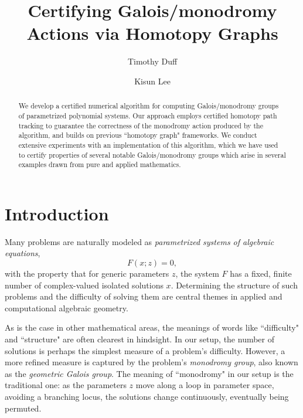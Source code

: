 \documentclass[11pt]{amsart}
\title{Certifying Galois/monodromy Actions via Homotopy Graphs}
\author{Timothy Duff}
\author{Kisun Lee}
\let\oldtextit\textit
\renewcommand\emph[1]{\oldtextit{\color{blue}#1}}
\theoremstyle{definition}
\theoremstyle{remark}
\begin{document}
\begin{abstract}
We develop a certified numerical algorithm for computing Galois/monodromy groups of parametrized polynomial systems. Our approach employs certified homotopy path tracking to guarantee the correctness of the monodromy action produced by the algorithm, and builds on previous ``homotopy graph" frameworks. 
We conduct extensive experiments with an implementation of this algorithm, which we have used to certify properties of several notable Galois/monodromy groups which arise in several examples drawn from pure and applied mathematics.
\end{abstract}

\maketitle

\section{Introduction}

Many problems are naturally modeled as \emph{parametrized systems of algebraic equations}, \begin{equation}F(x;z)=0\label{eq:Fxz},\end{equation} with the property that for generic parameters $z$, the system $F$ has a fixed, finite number of complex-valued isolated solutions $x$.
Determining the structure of such problems and the difficulty of solving them are central themes in applied and computational algebraic geometry.

As is the case in other mathematical areas, the meanings of words like ``difficulty" and ``structure" are often clearest in hindsight. 
In our setup, the number of solutions is perhaps the simplest measure of a problem's difficulty.
However, a more refined measure is captured by the problem's \emph{monodromy group}, also known as the \emph{geometric Galois group}. 
The meaning of ``monodromy" in our setup is the traditional one: as the parameters $z$ move along a loop in parameter space, avoiding a branching locus, the solutions change continuously, eventually being permuted.
\end{document}

